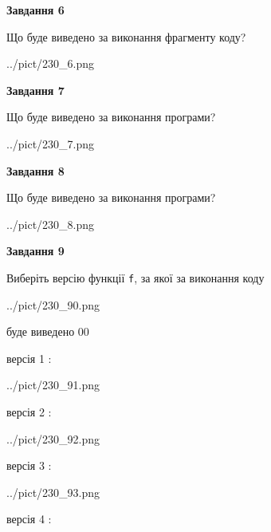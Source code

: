 \documentclass[12pt, ukrainian]{article}
\def\code#1{\Verb!#1!}
\begin{document}
{\begin {large}
{\begin {center}\textbf{Завдання 6}\end {center}}

Що буде виведено за виконання фрагменту коду?\par
\begin{center}
	{../pict/230_6.png}
\end{center}
\newpage

{\begin {center}\textbf{Завдання 7}\end {center}}

Що буде виведено за виконання програми?\par
\begin{center}
	{../pict/230_7.png}
\end{center}
\newpage

{\begin {center}\textbf{Завдання 8}\end {center}}

Що буде виведено за виконання програми?\par
\begin{center}
	{../pict/230_8.png}
\end{center}
\newpage

{\begin {center}\textbf{Завдання 9}\end {center}}

Виберіть версію функції \code{f}, за якої за виконання коду
\begin{center}
	{../pict/230_90.png}
\end{center}
буде виведено 00

\vspace{5mm}
версія 1 :

\begin{center}
	{../pict/230_91.png}
\end{center}
версія 2 :

\begin{center}
	{../pict/230_92.png}
\end{center}
версія 3 :

\begin{center}
	{../pict/230_93.png}
\end{center}
версія 4 :


\end{large}}
\end{document}
